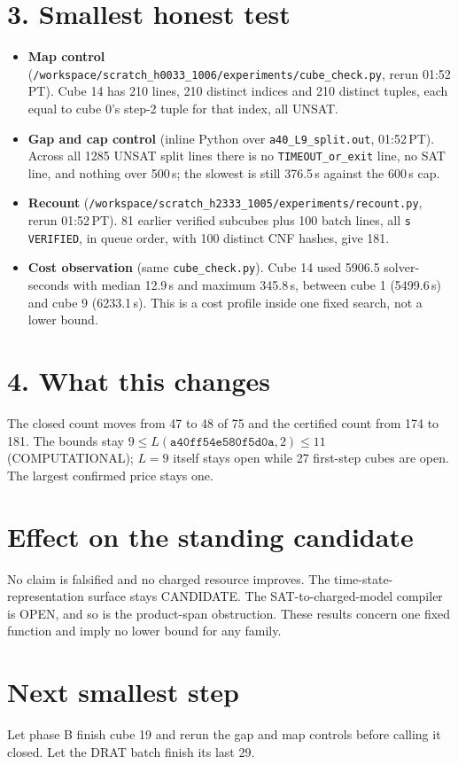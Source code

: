 \documentclass[11pt]{article}
\begin{document}
\section*{3. Smallest honest test}
\begin{itemize}
\item \textbf{Map control} (\texttt{/workspace/scratch\_h0033\_1006/experiments/cube\_check.py}, rerun 01:52\,PT). Cube 14 has 210 lines, 210 distinct indices and 210 distinct tuples, each equal to cube 0's step-2 tuple for that index, all UNSAT.
\item \textbf{Gap and cap control} (inline Python over \texttt{a40\_L9\_split.out}, 01:52\,PT). Across all 1285 UNSAT split lines there is no \texttt{TIMEOUT\_or\_exit} line, no SAT line, and nothing over 500\,s; the slowest is still 376.5\,s against the 600\,s cap.
\item \textbf{Recount} (\texttt{/workspace/scratch\_h2333\_1005/experiments/recount.py}, rerun 01:52\,PT). 81 earlier verified subcubes plus 100 batch lines, all \texttt{s VERIFIED}, in queue order, with 100 distinct CNF hashes, give 181.
\item \textbf{Cost observation} (same \texttt{cube\_check.py}). Cube 14 used 5906.5 solver-seconds with median 12.9\,s and maximum 345.8\,s, between cube 1 (5499.6\,s) and cube 9 (6233.1\,s). This is a cost profile inside one fixed search, not a lower bound.
\end{itemize}

\section*{4. What this changes}
The closed count moves from 47 to 48 of 75 and the certified count from 174 to 181. The bounds stay $9\le L(\texttt{a40ff54e580f5d0a},2)\le 11$ (COMPUTATIONAL); $L=9$ itself stays open while 27 first-step cubes are open. The largest confirmed price stays one.

\section*{Effect on the standing candidate}
No claim is falsified and no charged resource improves. The time-state-representation surface stays CANDIDATE. The SAT-to-charged-model compiler is OPEN, and so is the product-span obstruction. These results concern one fixed function and imply no lower bound for any family.

\section*{Next smallest step}
Let phase B finish cube 19 and rerun the gap and map controls before calling it closed. Let the DRAT batch finish its last 29.
\end{document}
